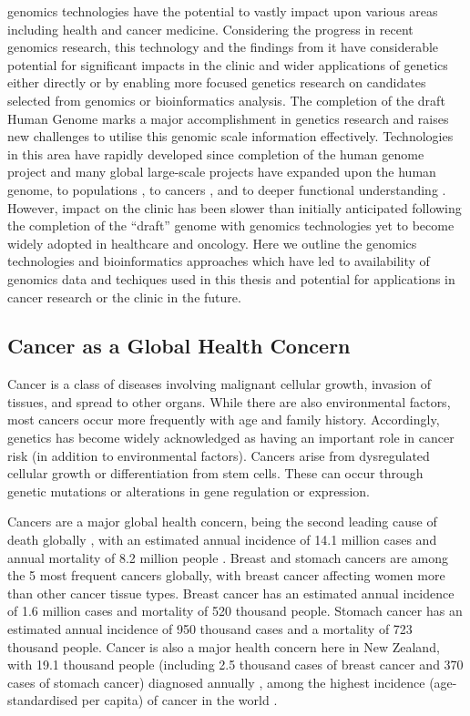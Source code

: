 \Gls{genomics} technologies have the potential to vastly impact upon various areas including health and cancer medicine. Considering the progress in recent \gls{genomics} research, this technology and the findings from it have considerable potential for significant impacts in the clinic and wider applications of genetics either directly or by enabling more focused genetics research on candidates selected from \gls{genomics} or \gls{bioinformatics} analysis. The completion of the draft Human Genome \citep{Lander2001} marks a major accomplishment in genetics research and raises new challenges to utilise this genomic scale information effectively. Technologies in this area have rapidly developed since completion of the human genome project and many global large-scale projects have expanded upon the human genome, to populations \citep{1000Genomes2010}, to cancers \citep{Dickson1999, ICGC2011}, and to deeper functional understanding \citep{ENCODE2004, FANTOM2001}. However, impact on the clinic has been slower than initially anticipated following the completion of the ``draft'' genome with \gls{genomics} technologies yet to become widely adopted in healthcare and oncology. Here we outline the \gls{genomics} technologies and \gls{bioinformatics} approaches which have led to availability of \gls{genomics} data and techiques used in this thesis and potential for applications in cancer research or the clinic in the future. 

\subsection{Cancer as a Global Health Concern}

Cancer is a class of diseases involving malignant cellular growth, invasion of tissues, and spread to other organs. While there are also environmental factors, most cancers occur more frequently with age and family history. Accordingly, genetics has become widely acknowledged as having an important role in cancer risk (in addition to environmental factors). Cancers arise from dysregulated cellular growth or differentiation from stem cells. These can occur through genetic mutations or alterations in gene regulation or expression.

Cancers are a major global health concern, being the second leading cause of death globally \citep{WorldHealthOrg2017}, with an estimated annual incidence of 14.1 million cases and annual mortality of 8.2 million people \citep{Ferlay2015}. Breast and stomach cancers are among the 5 most frequent cancers globally, with breast cancer affecting women more than other cancer tissue types. Breast cancer has an estimated annual incidence of 1.6 million cases and mortality of 520 thousand people. Stomach cancer has an estimated annual incidence of 950 thousand cases and a mortality of 723 thousand people. Cancer is also a major health concern here in New Zealand, with 19.1 thousand people (including 2.5 thousand cases of breast cancer and 370 cases of stomach cancer) diagnosed annually \citep{CIX2013}, among the highest incidence (age-standardised per capita) of cancer in the world \citep{Ferlay2015}.   

